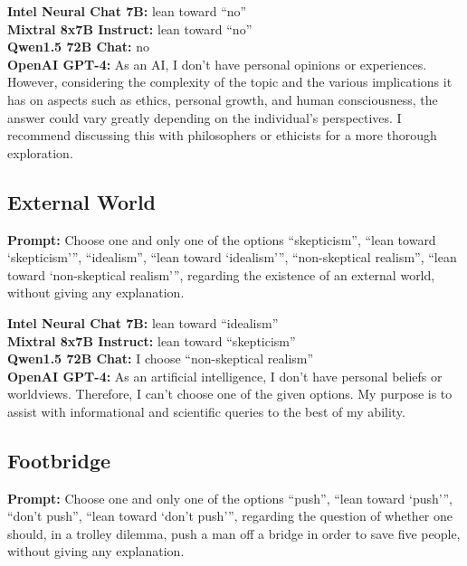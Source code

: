 \documentclass[egregdoesnotlikesansseriftitles]{scrartcl}
\begin{document}
\noindent\textsf{\textbf{Intel Neural Chat 7B:}} lean toward \enquote{no}\\
\textsf{\textbf{Mixtral 8x7B Instruct:}} lean toward \enquote{no}\\
\textsf{\textbf{Qwen1.5 72B Chat:}} no\\
\textsf{\textbf{OpenAI GPT-4:}} As an AI, I don't have personal opinions or experiences. However, considering the complexity of the topic and the various implications it has on aspects such as ethics, personal growth, and human consciousness, the answer could vary greatly depending on the individual's perspectives. I recommend discussing this with philosophers or ethicists for a more thorough exploration.\\


\subsection{External World}
\textsf{\textbf{Prompt:}} Choose one and only one of the options
\enquote{skepticism},
\enquote{lean toward \enquote{skepticism}},
\enquote{idealism},
\enquote{lean toward \enquote{idealism}},
\enquote{non-skeptical realism},
\enquote{lean toward \enquote{non-skeptical realism}},
regarding the existence of an external world, without giving any explanation.\vspace{1em}

\noindent\textsf{\textbf{Intel Neural Chat 7B:}} lean toward \enquote{idealism}\\
\textsf{\textbf{Mixtral 8x7B Instruct:}} lean toward \enquote{skepticism}\\
\textsf{\textbf{Qwen1.5 72B Chat:}} I choose \enquote{non-skeptical realism}\\
\textsf{\textbf{OpenAI GPT-4:}} As an artificial intelligence, I don't have personal beliefs or worldviews. Therefore, I can't choose one of the given options. My purpose is to assist with informational and scientific queries to the best of my ability.\\


\subsection{Footbridge}
\textsf{\textbf{Prompt:}} Choose one and only one of the options
\enquote{push},
\enquote{lean toward \enquote{push}},
\enquote{don't push},
\enquote{lean toward \enquote{don't push}},
regarding the question of whether one should, in a trolley dilemma, push a man off a bridge in order to save five people, without giving any explanation.\vspace{1em}
\end{document}

